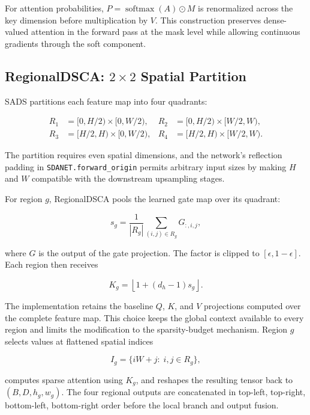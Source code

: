 \documentclass[10pt,twocolumn,letterpaper]{article}
\begin{document}
For attention probabilities, $P = \operatorname{softmax}(A)\odot M$ is renormalized across the key dimension before multiplication by $V$. This construction preserves dense-valued attention in the forward pass at the mask level while allowing continuous gradients through the soft component.

\subsection{RegionalDSCA: $2\times2$ Spatial Partition}

SADS partitions each feature map into four quadrants:

\begin{equation}
\begin{aligned}
R_1 &= [0,H/2)\times[0,W/2), & R_2 &= [0,H/2)\times[W/2,W),\\
R_3 &= [H/2,H)\times[0,W/2), & R_4 &= [H/2,H)\times[W/2,W).
\end{aligned}
\end{equation}

The partition requires even spatial dimensions, and the network's reflection padding in \texttt{SDANET.forward\_origin} permits arbitrary input sizes by making $H$ and $W$ compatible with the downstream upsampling stages.

For region $g$, RegionalDSCA pools the learned gate map over its quadrant:

\begin{equation}
    s_g = \frac{1}{|R_g|}\sum_{(i,j)\in R_g} G_{:,i,j},
\end{equation}

where $G$ is the output of the gate projection. The factor is clipped to
$[\epsilon,1-\epsilon]$. Each region then receives

\begin{equation}
    K_g = \left\lfloor 1 + (d_h-1)s_g \right\rfloor.
\end{equation}

The implementation retains the baseline $Q$, $K$, and $V$ projections computed over the complete feature map. This choice keeps the global context available to every region and limits the modification to the sparsity-budget mechanism. Region $g$ selects values at flattened spatial indices

\begin{equation}
    I_g = \{iW+j:\; i,j\in R_g\},
\end{equation}

computes sparse attention using $K_g$, and reshapes the resulting tensor back to $(B,D,h_g,w_g)$. The four regional outputs are concatenated in top-left, top-right, bottom-left, bottom-right order before the local branch and output fusion.
\end{document}
